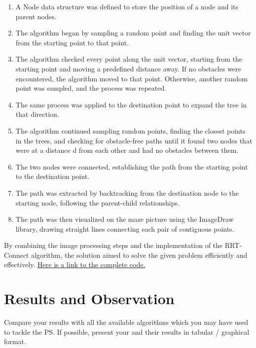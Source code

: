 \documentclass[letterpaper, 10 pt, conference]{IEEEtran}
\begin{document}
\begin{enumerate}

\item A Node data structure was defined to store the position of a node and its parent nodes.

\item The algorithm began by sampling a random point and finding the unit vector from the starting point to that point.

\item The algorithm checked every point along the unit vector, starting from the starting point and moving a predefined 
distance away. If no obstacles were encountered, the algorithm moved to that point. Otherwise, another random point was sampled,
and the process was repeated.

\item The same process was applied to the destination point to expand the tree in that direction.

\item The algorithm continued sampling random points, finding the closest points in the trees, and checking for obstacle-free 
paths until it found two nodes that were at a distance d from each other and had no obstacles between them.

\item The two nodes were connected, establishing the path from the starting point to the destination point.

\item The path was extracted by backtracking from the destination node to the starting node, following the parent-child relationships.

\item The path was then visualized on the maze picture using the ImageDraw library, drawing straight lines connecting each pair 
of contiguous points.
\end{enumerate}
By combining the image processing steps and the implementation of the RRT-Connect algorithm, the solution aimed to solve the given 
problem efficiently and effectively.
\href{https://colab.research.google.com/drive/1B-TT8nmE13GdDY71ofqr2LRW5MCIAywc?usp=sharing}{Here is a link to the complete code.}

\section{Results and Observation}

Compare your results with all the available algorithms which you may have used to tackle the PS. If possible, present your and their results in tabular / graphical format.
\end{document}
